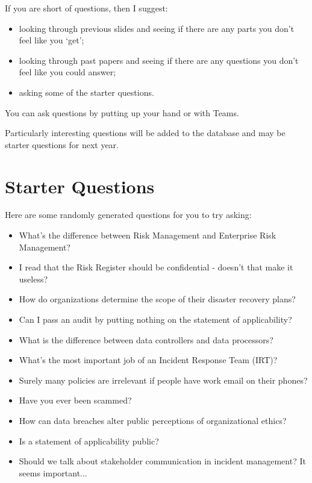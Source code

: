 \documentclass[12pt]{article}
\begin{document}
If you are short of questions, then I suggest: 

\begin{itemize} 
\item looking through previous slides and seeing if there are any parts you don't feel like you `get';
\item looking through past papers and seeing if there are any questions you don't feel like you could answer;
\item asking some of the starter questions.
\end{itemize} 

You can ask questions by putting up your hand or with Teams.  

Particularly interesting questions will be added to the database and may be starter questions for next year.  

\section*{Starter Questions} 
Here are some randomly generated questions for you to try asking: 

\begin{itemize}
  \item What's the difference between Risk Management and Enterprise Risk Management?
  \item I read that the Risk Register should be confidential - doesn't that make it useless?
  \item How do organizations determine the scope of their disaster recovery plans?
  \item Can I pass an audit by putting nothing on the statement of applicability?
  \item What is the difference between data controllers and data processors?
  \item What's the most important job of an Incident Response Team (IRT)?
  \item Surely many policies are irrelevant if people have work email on their phones?
  \item Have you ever been scammed?
  \item How can data breaches alter public perceptions of organizational ethics?
  \item Is a statement of applicability public?
  \item Should we talk about stakeholder communication in incident management? It seems important...
\end{itemize}
\end{document}
